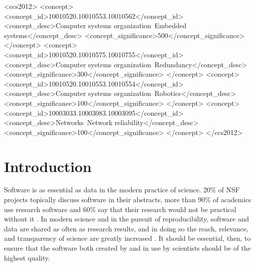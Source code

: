 \documentclass[acmtog, authorversion]{acmart}
\begin{document}
\begin{CCSXML}
<ccs2012>
 <concept>
  <concept_id>10010520.10010553.10010562</concept_id>
  <concept_desc>Computer systems organization~Embedded systems</concept_desc>
  <concept_significance>500</concept_significance>
 </concept>
 <concept>
  <concept_id>10010520.10010575.10010755</concept_id>
  <concept_desc>Computer systems organization~Redundancy</concept_desc>
  <concept_significance>300</concept_significance>
 </concept>
 <concept>
  <concept_id>10010520.10010553.10010554</concept_id>
  <concept_desc>Computer systems organization~Robotics</concept_desc>
  <concept_significance>100</concept_significance>
 </concept>
 <concept>
  <concept_id>10003033.10003083.10003095</concept_id>
  <concept_desc>Networks~Network reliability</concept_desc>
  <concept_significance>100</concept_significance>
 </concept>
</ccs2012>
\end{CCSXML}




\maketitle

\section{Introduction}

Software is as essential as data in the modern practice of science. 20\% of NSF projects topically discuss software in their abstracts, more than 90\% of academics use research software and 60\% say that their research would not be practical without it \cite{Nangia17}. In modern science and in the pursuit of reproducibility, software and data are shared as often as research results, and in doing so the reach, relevance, and transparency of science are greatly increased \cite{Renci}. It should be essential, then, to ensure that the software both created by and in use by scientists should be of the highest quality.
\end{document}
